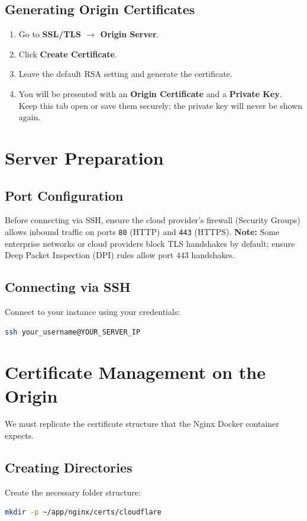 \documentclass[12pt,a4paper]{article}
\begin{document}
\subsection{Generating Origin Certificates}
\begin{enumerate}
    \item Go to \textbf{SSL/TLS $\rightarrow$ Origin Server}.
    \item Click \textbf{Create Certificate}.
    \item Leave the default RSA setting and generate the certificate.
    \item You will be presented with an \textbf{Origin Certificate} and a \textbf{Private Key}. Keep this tab open or save them securely; the private key will never be shown again.
\end{enumerate}

\section{Server Preparation}

\subsection{Port Configuration}
Before connecting via SSH, ensure the cloud provider's firewall (Security Groups) allows inbound traffic on ports \texttt{80} (HTTP) and \texttt{443} (HTTPS). \textbf{Note:} Some enterprise networks or cloud providers block TLS handshakes by default; ensure Deep Packet Inspection (DPI) rules allow port 443 handshakes.

\subsection{Connecting via SSH}
Connect to your instance using your credentials:
\begin{lstlisting}[language=bash]
ssh your_username@YOUR_SERVER_IP
\end{lstlisting}

\section{Certificate Management on the Origin}
We must replicate the certificate structure that the Nginx Docker container expects.

\subsection{Creating Directories}
Create the necessary folder structure:
\begin{lstlisting}[language=bash]
mkdir -p ~/app/nginx/certs/cloudflare
\end{lstlisting}
\end{document}
